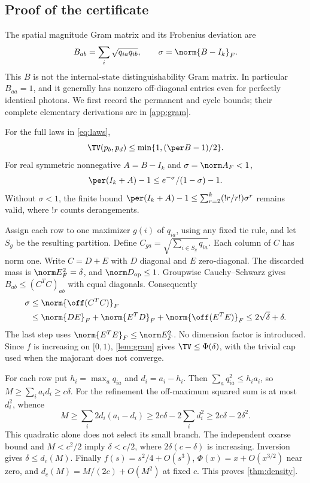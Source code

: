 \subsection{Proof of the certificate}
The spatial magnitude Gram matrix and its Frobenius deviation are
\begin{equation}
 B_{ab}=\sum_i\sqrt{q_{ia}q_{ib}},\qquad \sigma=\norm{B-I_k}_F.\label{eq:gram}
\end{equation}
This $B$ is not the internal-state distinguishability Gram matrix. In particular $B_{aa}=1$, and it generally has nonzero off-diagonal entries even for perfectly identical photons. We first record the permanent and cycle bounds; their complete elementary derivations are in \cref{app:gram}.
\begin{lemma}\label{lem:gram}
For the full laws in \cref{eq:laws},
\begin{equation}
 \TV(p_b,p_d)\le\min\{1,(\per B-1)/2\}.
\end{equation}
For real symmetric nonnegative $A=B-I_k$ and $\sigma=\norm A_F<1$,
\begin{equation}
 \per(I_k+A)-1\le e^{-\sigma}/(1-\sigma)-1.
\end{equation}
Without $\sigma<1$, the finite bound $\per(I_k+A)-1\le\sum_{r=2}^k(!r/r!)\sigma^r$ remains valid, where $!r$ counts derangements.
\end{lemma}

Assign each row to one maximizer $g(i)$ of $q_{ia}$, using any fixed tie rule, and let $S_g$ be the resulting partition. Define $C_{ga}=\sqrt{\sum_{i\in S_g}q_{ia}}$. Each column of $C$ has norm one. Write $C=D+E$ with $D$ diagonal and $E$ zero-diagonal. The discarded mass is $\norm E_F^2=\delta$, and $\norm D_{\mathrm{op}}\le1$. Groupwise Cauchy--Schwarz gives $B_{ab}\le(C^TC)_{ab}$ with equal diagonals. Consequently
\begin{align}
 \sigma&\le\norm{\off(C^TC)}_F\nonumber\\
 &\le\norm{DE}_F+\norm{E^TD}_F+\norm{\off(E^TE)}_F
 \le2\sqrt\delta+\delta.\label{eq:support}
\end{align}
The last step uses $\norm{E^TE}_F\le\norm E_F^2$. No dimension factor is introduced. Since $f$ is increasing on $[0,1)$, \cref{lem:gram} gives $\TV\le\Phi(\delta)$, with the trivial cap used when the majorant does not converge.

For each row put $h_i=\max_aq_{ia}$ and $d_i=a_i-h_i$. Then $\sum_aq_{ia}^2\le h_ia_i$, so $M\ge\sum_i a_id_i\ge c\delta$. For the refinement the off-maximum squared sum is at most $d_i^2$, whence
\begin{equation}
 M\ge\sum_i2d_i(a_i-d_i)\ge2c\delta-2\sum_i d_i^2
 \ge2c\delta-2\delta^2.\label{eq:quadratic}
\end{equation}
This quadratic alone does not select its small branch. The independent coarse bound and $M<c^2/2$ imply $\delta<c/2$, where $2\delta(c-\delta)$ is increasing. Inversion gives $\delta\le d_c(M)$. Finally $f(s)=s^2/4+O(s^3)$, $\Phi(x)=x+O(x^{3/2})$ near zero, and $d_c(M)=M/(2c)+O(M^2)$ at fixed $c$. This proves \cref{thm:density}.

